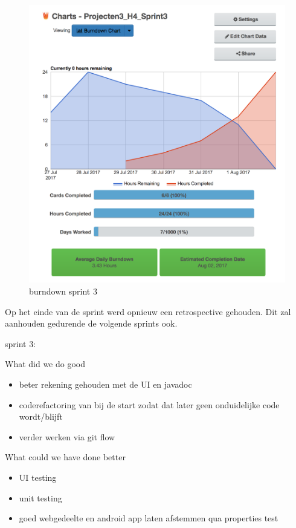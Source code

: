 \begin{figure}[H]
	\centering
\includegraphics[width=15cm]{img/burndown_week3.png}
\caption{burndown sprint 3}
\end{figure}

Op het einde van de sprint werd opnieuw een retrospective gehouden. Dit zal aanhouden gedurende de volgende sprints ook.

sprint 3:

What did we do good

\begin{itemize}
\item  beter rekening gehouden met de UI en javadoc
\item  coderefactoring van bij de start zodat dat later geen onduidelijke code wordt/blijft
\item verder werken via git flow
\end{itemize}

What could we have done better

\begin{itemize}
\item UI testing
\item unit testing
\item goed webgedeelte en android app laten afstemmen qua properties test
\end{itemize}


